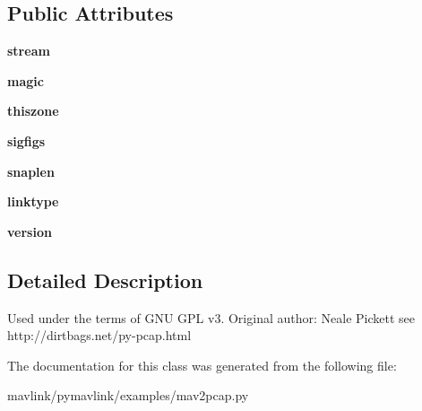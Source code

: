 \subsection*{Public Attributes}
\begin{DoxyCompactItemize}
\item 
\mbox{\label{classpymavlink_1_1examples_1_1mav2pcap_1_1pcap_a6eb6661b277c5925d2338f6eabd16c69}} 
{\bfseries stream}
\item 
\mbox{\label{classpymavlink_1_1examples_1_1mav2pcap_1_1pcap_a0e063a10152425afec9ca9cc25fb2785}} 
{\bfseries magic}
\item 
\mbox{\label{classpymavlink_1_1examples_1_1mav2pcap_1_1pcap_a1c395139e6a08d237ca71d108b25488a}} 
{\bfseries thiszone}
\item 
\mbox{\label{classpymavlink_1_1examples_1_1mav2pcap_1_1pcap_a7ab6d299412e722819cbcdd6c8558762}} 
{\bfseries sigfigs}
\item 
\mbox{\label{classpymavlink_1_1examples_1_1mav2pcap_1_1pcap_a38d6c237bd315b0cd4abf138aaf262e1}} 
{\bfseries snaplen}
\item 
\mbox{\label{classpymavlink_1_1examples_1_1mav2pcap_1_1pcap_a813b36d754099808dced606c51cbf037}} 
{\bfseries linktype}
\item 
\mbox{\label{classpymavlink_1_1examples_1_1mav2pcap_1_1pcap_a43f4774ba84bc5f07169f86764a53e0e}} 
{\bfseries version}
\end{DoxyCompactItemize}


\subsection{Detailed Description}
\begin{DoxyVerb}   Used under the terms of GNU GPL v3.
   Original author: Neale Pickett
   see http://dirtbags.net/py-pcap.html
\end{DoxyVerb}
 

The documentation for this class was generated from the following file\+:\begin{DoxyCompactItemize}
\item 
mavlink/pymavlink/examples/mav2pcap.\+py\end{DoxyCompactItemize}

